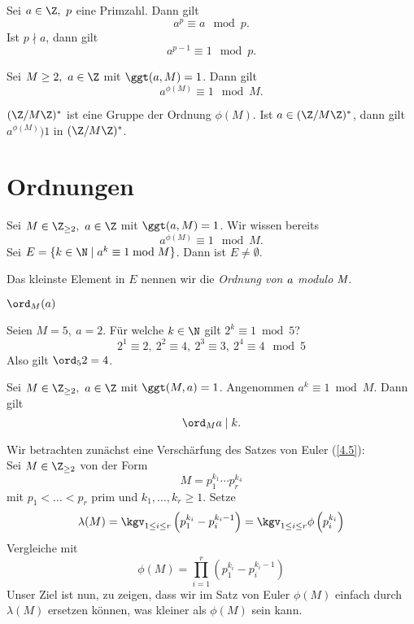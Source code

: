 \begin{thm}\autolabel
	Sei $a \in \Z,\ p $ eine Primzahl. Dann gilt
	\[ a^p \equiv a \mod p. \]
	Ist $p \nmid a$, dann gilt
	\[ a^{p-1} \equiv 1 \mod p. \]
\end{thm}

\begin{thm}[Euler]\autolabel
	Sei $M \geq 2,\ a \in \Z$ mit $\ggt(a,M) = 1$. Dann gilt
	\[ a^{\phi(M)} \equiv 1 \mod M. \]
\end{thm}

\begin{rem*}
	$(\Z/M\Z)^*$ ist eine Gruppe der Ordnung $\phi(M)$. Ist $a \in (\Z/M\Z)^*$, dann gilt $a^{\phi(M)} ) 1$ in $(\Z/M\Z)^*$.
\end{rem*}

\section*{Ordnungen}

Sei $M \in \Z_{\geq 2},\ a \in \Z$ mit $\ggt(a,M)=1$. Wir wissen bereits 
\[ a^{\phi(M)} \equiv 1 \mod M. \]
Sei $E = \{k \in \N \mid a^k \equiv 1 \bmod M\}$. Dann ist $E \neq \emptyset$.

\begin{defn*}[Ordnung]
	Das kleinste Element in $E$ nennen wir die \emph{Ordnung von $\emph{a}$ modulo $\emph{M}$}.
	\begin{notat*}
		$\ord_M(a)$
	\end{notat*}
\end{defn*}

\begin{exmp*}
	Seien $M = 5,\ a= 2$. Für welche $k \in \N$ gilt $2^k \equiv 1 \bmod 5$?
	\[ 2^1 \equiv 2,\ 2^2 \equiv 4,\ 2^3 \equiv 3,\ 2^4 \equiv 4 \mod 5 \]
	Also gilt $\ord_5 2 = 4$.
\end{exmp*}

\begin{lem}\autolabel
	Sei $M \in \Z_{\geq 2},\ a \in \Z$ mit $\ggt(M,a)=1$. Angenommen $a^k \equiv 1 \bmod M$. Dann gilt
	\[ \ord_M a \mid k. \]
\end{lem}

\video Wir betrachten zunächst eine Verschärfung des Satzes von Euler (\ref{4.5}):\\
Sei $M \in \Z_{\geq 2}$ von der Form
\[ M = p_1^{k_1} \dotsm p_r^{k_4} \]
mit $p_1 < \dots < p_r$ prim und $k_1, \dotsc, k_r \geq 1$. Setze
\[ \lambda(M) = \kgv_{1 \leq i \leq r} \left( p_1^{k_i} - p_i^{k_i - 1} \right) = \kgv_{1 \leq i \leq r} \phi\left(p_i^{k_i}\right) \]
Vergleiche mit
\[ \phi(M) = \prod_{i=1}^r \left( p_1^{k_i} - p_i^{k_i - 1} \right) \]
Unser Ziel ist nun, zu zeigen, dass wir im Satz von Euler $\phi(M)$ einfach durch $\lambda(M)$ ersetzen können, was kleiner als $\phi(M)$ sein kann.

